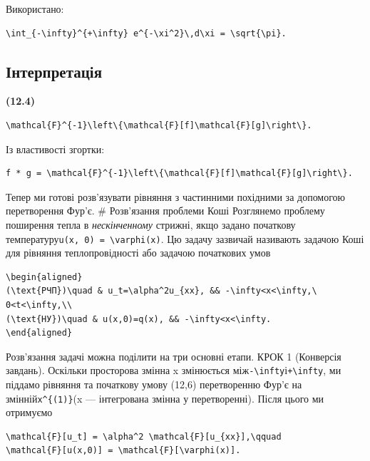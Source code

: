 \documentclass[
  ukrainian,
]{article}
\begin{document}
Використано:

\begin{verbatim}
\int_{-\infty}^{+\infty} e^{-\xi^2}\,d\xi = \sqrt{\pi}.
\end{verbatim}

\subsection{Інтерпретація}\label{ux456ux43dux442ux435ux440ux43fux440ux435ux442ux430ux446ux456ux44f}

\textbf{(12.4)}

\begin{verbatim}
\mathcal{F}^{-1}\left\{\mathcal{F}[f]\mathcal{F}[g]\right\}.
\end{verbatim}

Із властивості згортки:

\begin{verbatim}
f * g = \mathcal{F}^{-1}\left\{\mathcal{F}[f]\mathcal{F}[g]\right\}.
\end{verbatim}

Тепер ми готові розв'язувати рівняння з частинними похідними за
допомогою перетворення Фур'є. \# Розв'язання проблеми Коші Розглянемо
проблему поширення тепла в \emph{нескінченному} стрижні, якщо задано
початкову температуру\texttt{u(x,\ 0)\ =\ \textbackslash{}varphi(x)}. Цю
задачу зазвичай називають задачою Коші для рівняння теплопровідності або
задачою початкових умов

\begin{verbatim}
\begin{aligned}
(\text{РЧП})\quad & u_t=\alpha^2u_{xx}, && -\infty<x<\infty,\ 0<t<\infty,\\
(\text{НУ})\quad & u(x,0)=q(x), && -\infty<x<\infty.
\end{aligned}
\end{verbatim}

Розв'язання задачі можна поділити на три основні етапи. КРОК 1
(Конверсія завдань). Оскільки просторова змінна x змінюється
між\texttt{-\textbackslash{}infty}і\texttt{+\textbackslash{}infty}, ми
піддамо рівняння та початкову умову (12,6) перетворенню Фур'є на
змінній\texttt{x\^{}\{(1)\}}(x --- інтегрована змінна у перетворенні).
Після цього ми отримуємо

\begin{verbatim}
\mathcal{F}[u_t] = \alpha^2 \mathcal{F}[u_{xx}],\qquad
\mathcal{F}[u(x,0)] = \mathcal{F}[\varphi(x)].
\end{verbatim}
\end{document}
